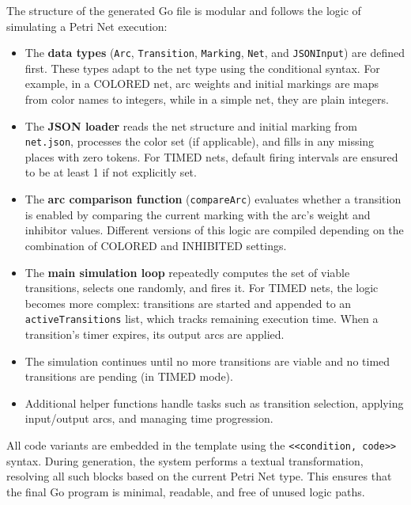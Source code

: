 \documentclass[12pt]{article}
\begin{document}
            The structure of the generated Go file is modular and follows the logic of simulating a Petri Net execution:
            
            \begin{itemize}
            \item The \textbf{data types} (\texttt{Arc}, \texttt{Transition}, \texttt{Marking}, \texttt{Net}, and \texttt{JSONInput}) are defined first. These types adapt to the net type using the conditional syntax. For example, in a COLORED net, arc weights and initial markings are maps from color names to integers, while in a simple net, they are plain integers.
            \item The \textbf{JSON loader} reads the net structure and initial marking from \texttt{net.json}, processes the color set (if applicable), and fills in any missing places with zero tokens. For TIMED nets, default firing intervals are ensured to be at least 1 if not explicitly set.

            \item The \textbf{arc comparison function} (\texttt{compareArc}) evaluates whether a transition is enabled by comparing the current marking with the arc’s weight and inhibitor values. Different versions of this logic are compiled depending on the combination of COLORED and INHIBITED settings.

            \item The \textbf{main simulation loop} repeatedly computes the set of viable transitions, selects one randomly, and fires it. For TIMED nets, the logic becomes more complex: transitions are started and appended to an \texttt{activeTransitions} list, which tracks remaining execution time. When a transition’s timer expires, its output arcs are applied.

            \item The simulation continues until no more transitions are viable and no timed transitions are pending (in TIMED mode).

            \item Additional helper functions handle tasks such as transition selection, applying input/output arcs, and managing time progression.
            \end{itemize}

            All code variants are embedded in the template using the \texttt{<<condition, code>>} syntax. During generation, the system performs a textual transformation, resolving all such blocks based on the current Petri Net type. This ensures that the final Go program is minimal, readable, and free of unused logic paths.
        
\end{document}
